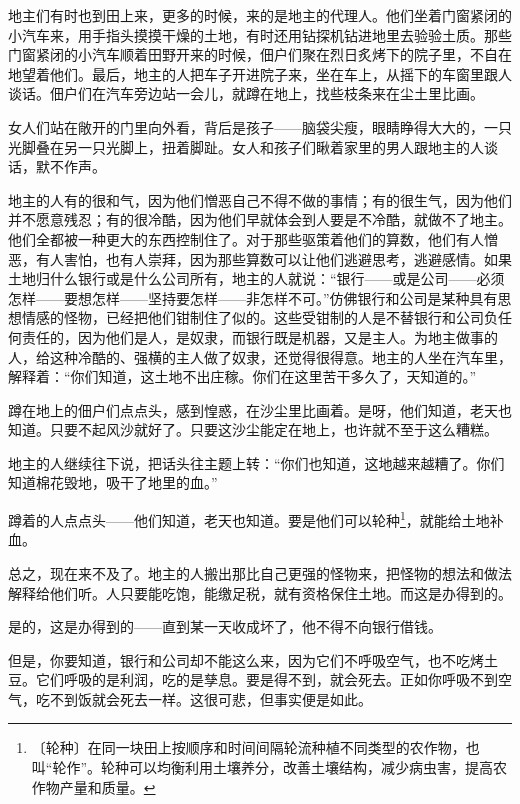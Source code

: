 \documentclass[12pt,UTF-8,openany]{ctexbook}
\begin{document}
\begin{normalsize}
    
    地主们有时也到田上来，更多的时候，来的是地主的代理人。他们坐着门窗紧闭的小汽车来，用手指头摸摸干燥的土地，有时还用钻探机钻进地里去验验土质。那些门窗紧闭的小汽车顺着田野开来的时候，佃户们聚在烈日炙烤下的院子里，不自在地望着他们。最后，地主的人把车子开进院子来，坐在车上，从摇下的车窗里跟人谈话。佃户们在汽车旁边站一会儿，就蹲在地上，找些枝条来在尘土里比画。
    
    女人们站在敞开的门里向外看，背后是孩子——脑袋尖瘦，眼睛睁得大大的，一只光脚叠在另一只光脚上，扭着脚趾。女人和孩子们瞅着家里的男人跟地主的人谈话，默不作声。
    
    地主的人有的很和气，因为他们憎恶自己不得不做的事情；有的很生气，因为他们并不愿意残忍；有的很冷酷，因为他们早就体会到人要是不冷酷，就做不了地主。他们全都被一种更大的东西控制住了。对于那些驱策着他们的算数，他们有人憎恶，有人害怕，也有人崇拜，因为那些算数可以让他们逃避思考，逃避感情。如果土地归什么银行或是什么公司所有，地主的人就说：“银行——或是公司——必须怎样——要想怎样——坚持要怎样——非怎样不可。”仿佛银行和公司是某种具有思想情感的怪物，已经把他们钳制住了似的。这些受钳制的人是不替银行和公司负任何责任的，因为他们是人，是奴隶，而银行既是机器，又是主人。为地主做事的人，给这种冷酷的、强横的主人做了奴隶，还觉得很得意。地主的人坐在汽车里，解释着：“你们知道，这土地不出庄稼。你们在这里苦干多久了，天知道的。”
    
    蹲在地上的佃户们点点头，感到惶惑，在沙尘里比画着。是呀，他们知道，老天也知道。只要不起风沙就好了。只要这沙尘能定在地上，也许就不至于这么糟糕。
    
    地主的人继续往下说，把话头往主题上转：“你们也知道，这地越来越糟了。你们知道棉花毁地，吸干了地里的血。”
    
    蹲着的人点点头——他们知道，老天也知道。要是他们可以轮种\footnote{〔轮种〕在同一块田上按顺序和时间间隔轮流种植不同类型的农作物，也叫“轮作”。轮种可以均衡利用土壤养分，改善土壤结构，减少病虫害，提高农作物产量和质量。}，就能给土地补血。
    
    总之，现在来不及了。地主的人搬出那比自己更强的怪物来，把怪物的想法和做法解释给他们听。人只要能吃饱，能缴足税，就有资格保住土地。而这是办得到的。
    
    是的，这是办得到的——直到某一天收成坏了，他不得不向银行借钱。
    
    但是，你要知道，银行和公司却不能这么来，因为它们不呼吸空气，也不吃烤土豆。它们呼吸的是利润，吃的是孳息。要是得不到，就会死去。正如你呼吸不到空气，吃不到饭就会死去一样。这很可悲，但事实便是如此。
    

\end{normalsize}
\end{document}
